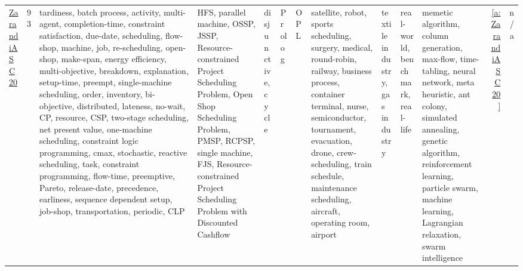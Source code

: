 {\begin{longtable}{>{\raggedright\arraybackslash}p{3cm}r>{\raggedright\arraybackslash}p{4cm}p{1.5cm}p{2cm}p{1.5cm}p{1.5cm}p{1.5cm}p{1.5cm}p{2cm}p{1.5cm}rr}
\href{../works/ZarandiASC20.pdf}{ZarandiASC20}~\cite{ZarandiASC20} & 93 & tardiness, batch process, activity, multi-agent, completion-time, constraint satisfaction, due-date, scheduling, flow-shop, machine, job, re-scheduling, open-shop, make-span, energy efficiency, multi-objective, breakdown, explanation, setup-time, preempt, single-machine scheduling, order, inventory, bi-objective, distributed, lateness, no-wait, CP, resource, CSP, two-stage scheduling, net present value, one-machine scheduling, constraint logic programming, cmax, stochastic, reactive scheduling, task, constraint programming, flow-time, preemptive, Pareto, release-date, precedence, earliness, sequence dependent setup, job-shop, transportation, periodic, CLP & HFS, parallel machine, OSSP, JSSP, Resource-constrained Project Scheduling Problem, Open Shop Scheduling Problem, PMSP, RCPSP, single machine, FJS, Resource-constrained Project Scheduling Problem with Discounted Cashflow & disjunctive, cycle & Prolog & OPL & satellite, robot, sports scheduling, surgery, medical, round-robin, railway, business process, container terminal, nurse, semiconductor, tournament, evacuation, drone, crew-scheduling, train schedule, maintenance scheduling, aircraft, operating room, airport & textile industry, gas industry & real-world, benchmark, real-life & memetic algorithm, column generation, max-flow, time-tabling, neural network, meta heuristic, ant colony, simulated annealing, genetic algorithm, reinforcement learning, particle swarm, machine learning, Lagrangian relaxation, swarm intelligence & \ref{a:ZarandiASC20} & n/a\\
\end{longtable}
}

